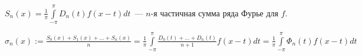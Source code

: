 \leavevmode


$S_n(x) = \frac{1}{\pi}\int\limits_{-\pi}^{\pi}D_n(t)f(x - t)dt$~--- $n$-я частичная сумма ряда Фурье для $f$.

$\sigma_n(x) := \frac{S_0(x) + S_1(x) + \ldots + S_n(x)}{n} = \frac{1}{\pi}\int\limits_{-\pi}^{\pi} \frac{D_0(t) + \ldots + D_n(t)}{n + 1}f(x - t) dt = \frac{1}{\pi} \int\limits_{-\pi}^{\pi}\Phi_n(t)f(x - t)dt$


\newpage

